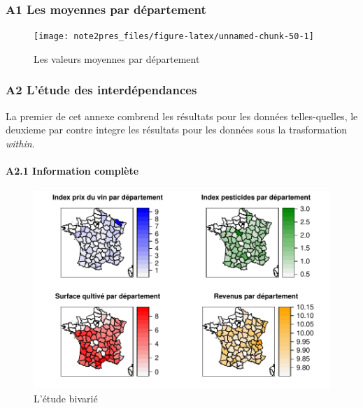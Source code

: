 \documentclass[11pt,]{article}
\let\oldparagraph\paragraph
\renewcommand{\paragraph}[1]{\oldparagraph{#1}\mbox{}}
\begin{document}
\hypertarget{a1-les-moyennes-par-departement}{%
\subsubsection{A1 Les moyennes par
département}\label{a1-les-moyennes-par-departement}}

\FloatBarrier

\begin{figure}[!htbp]

{\centering \texttt{[image: note2pres\_files/figure-latex/unnamed-chunk-50-1]} 

}

\caption{Les valeurs moyennes par département}\label{fig:unnamed-chunk-50}
\end{figure}

\FloatBarrier

\newpage

\hypertarget{a2-letude-des-interdependances}{%
\subsubsection{A2 L'étude des
interdépendances}\label{a2-letude-des-interdependances}}

La premier de cet annexe combrend les résultats pour les données
telles-quelles, le deuxieme par contre integre les résultats pour les
données sous la trasformation \emph{within}.

\hypertarget{a2.1-information-complete}{%
\paragraph{A2.1 Information complète}\label{a2.1-information-complete}}

\FloatBarrier

\begin{figure}[!htbp]

{\centering \includegraphics{note2pres_files/figure-latex/unnamed-chunk-51-1} 

}

\caption{L'étude bivarié}\label{fig:unnamed-chunk-51}
\end{figure}
\end{document}
